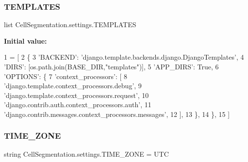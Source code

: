 \subsubsection{\texorpdfstring{T\+E\+M\+P\+L\+A\+T\+ES}{TEMPLATES}}
{\footnotesize\ttfamily list Cell\+Segmentation.\+settings.\+T\+E\+M\+P\+L\+A\+T\+ES}

{\bfseries Initial value\+:}
\begin{DoxyCode}
1 =  [
2     \{
3         \textcolor{stringliteral}{'BACKEND'}: \textcolor{stringliteral}{'django.template.backends.django.DjangoTemplates'},
4         \textcolor{stringliteral}{'DIRS'}: [os.path.join(BASE\_DIR,\textcolor{stringliteral}{"templates"})],
5         \textcolor{stringliteral}{'APP\_DIRS'}: \textcolor{keyword}{True},
6         \textcolor{stringliteral}{'OPTIONS'}: \{
7             \textcolor{stringliteral}{'context\_processors'}: [
8                 \textcolor{stringliteral}{'django.template.context\_processors.debug'},
9                 \textcolor{stringliteral}{'django.template.context\_processors.request'},
10                 \textcolor{stringliteral}{'django.contrib.auth.context\_processors.auth'},
11                 \textcolor{stringliteral}{'django.contrib.messages.context\_processors.messages'},
12             ],
13         \},
14     \},
15 ]
\end{DoxyCode}
\mbox{\label{namespace_cell_segmentation_1_1settings_a1f48388d09c7f8ef633a3be8ebbc43b1}} 
\subsubsection{\texorpdfstring{T\+I\+M\+E\+\_\+\+Z\+O\+NE}{TIME\_ZONE}}
{\footnotesize\ttfamily string Cell\+Segmentation.\+settings.\+T\+I\+M\+E\+\_\+\+Z\+O\+NE = \textquotesingle{}U\+TC\textquotesingle{}}

\mbox{\label{namespace_cell_segmentation_1_1settings_af72e8510bb688294b7bd306fd168c7da}} 
